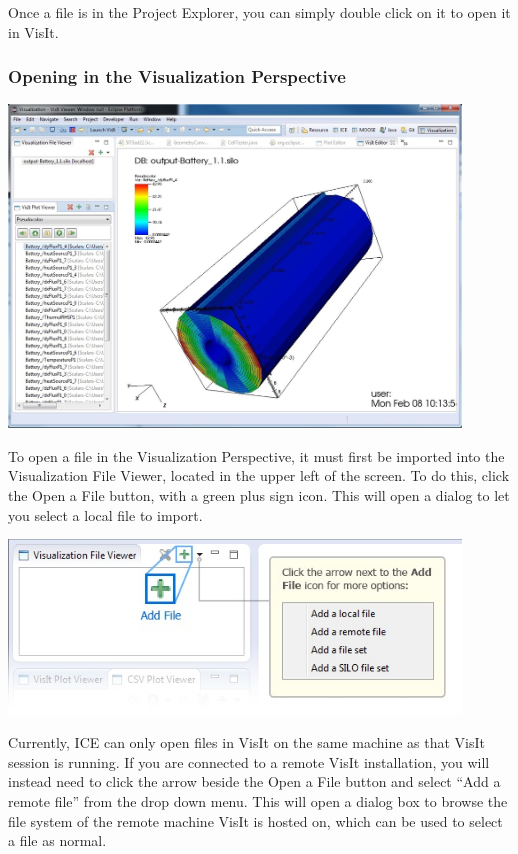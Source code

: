 \documentclass{article}
\begin{document}
Once a file is in the Project Explorer, you can simply double click on it to 
open it in VisIt.

\subsubsection{Opening in the Visualization Perspective}

\begin{center}
\includegraphics[width=12cm]{images/VisualizationPerspectiveOverview}
\end{center}

To open a file in the Visualization Perspective, it must first be imported into
the Visualization File Viewer, located in the upper left of the screen. To do
this, click the Open a File button, with a green plus sign icon. This will open
a dialog to let you select a local file to import.

\begin{center}
\includegraphics[width=12cm]{images/VisualizationAddFile}
\end{center}

Currently, ICE can only open files in VisIt on the same machine as that VisIt
session is running. If you are connected to a remote VisIt installation, you
will instead need to click the arrow beside the Open a File button and select
``Add a remote file'' from the drop down menu. This will open a dialog box to
browse the file system of the remote machine VisIt is hosted on, which can be
used to select a file as normal.
\end{document}
